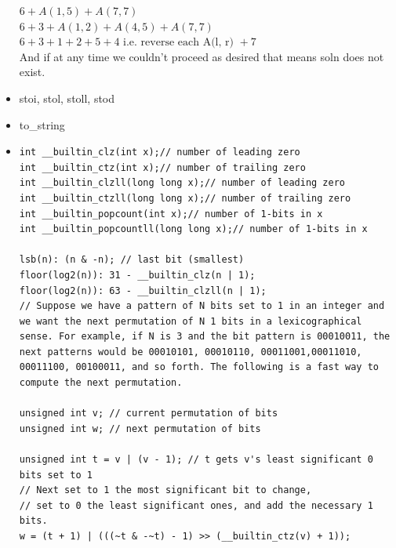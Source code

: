 \documentclass[8pt, a4paper, oneside, twocolumn]{extarticle}
\begin{document}
\begin{itemize}
    $6 + A(1, 5) + A(7, 7)$\\
    $6 + 3 + A(1, 2) + A(4, 5) + A(7, 7)$\\
    $6 + 3 + 1 + 2 + 5 + 4 \text{ i.e. reverse each A(l, r) } + 7$\\
    And if at any time we couldn't proceed as desired that means soln does not exist.
    \item stoi, stol, stoll, stod
    \item to\_{}string
    \item 
    \begin{verbatim}
int __builtin_clz(int x);// number of leading zero
int __builtin_ctz(int x);// number of trailing zero
int __builtin_clzll(long long x);// number of leading zero
int __builtin_ctzll(long long x);// number of trailing zero
int __builtin_popcount(int x);// number of 1-bits in x
int __builtin_popcountll(long long x);// number of 1-bits in x

lsb(n): (n & -n); // last bit (smallest)
floor(log2(n)): 31 - __builtin_clz(n | 1);
floor(log2(n)): 63 - __builtin_clzll(n | 1);
// Suppose we have a pattern of N bits set to 1 in an integer and we want the next permutation of N 1 bits in a lexicographical sense. For example, if N is 3 and the bit pattern is 00010011, the next patterns would be 00010101, 00010110, 00011001,00011010, 00011100, 00100011, and so forth. The following is a fast way to compute the next permutation.

unsigned int v; // current permutation of bits 
unsigned int w; // next permutation of bits

unsigned int t = v | (v - 1); // t gets v's least significant 0 bits set to 1
// Next set to 1 the most significant bit to change, 
// set to 0 the least significant ones, and add the necessary 1 bits.
w = (t + 1) | (((~t & -~t) - 1) >> (__builtin_ctz(v) + 1));  
    \end{verbatim}
\end{itemize}
\end{document}
